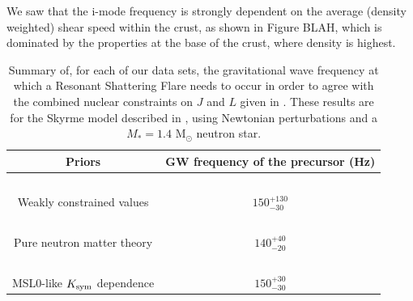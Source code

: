\documentclass[fleqn,usenatbib]{mnras}
\begin{document}

We saw that the i-mode frequency is strongly dependent on the average (density weighted) shear speed within the crust, as shown in Figure BLAH, which is dominated by the properties at the base of the crust, where density is highest.



\begin{table}
\centering
\begin{tabular}{|c|c|}
\hline
Priors&GW frequency of the precursor (Hz)\\

\hline
$ $& $ $\\[-9pt]
Weakly constrained values&$150^{+130}_{-30}$\\
\hline
$ $& $ $\\[-9pt]
Pure neutron matter theory&$140^{+40}_{-20}$\\
\hline
$ $& $ $\\[-9pt]
MSL0-like $K_{\rm sym}$ dependence&$150^{+30}_{-30}$\\
\hline
\end{tabular}
\caption{Summary of, for each of our data sets, the gravitational wave frequency at which a Resonant Shattering Flare needs to occur in order to agree with the combined nuclear constraints on $J$ and $L$ given in \citet{lattimer2013constraining,balantekin2014nuclear}. These results are for the Skyrme model described in \citet{newton2020nuclear}, using Newtonian perturbations and a $M_*=1.4$ M${_\odot}$ neutron star.}
\label{tab:freq_to_match_nuclear}
\end{table}
\end{document}
